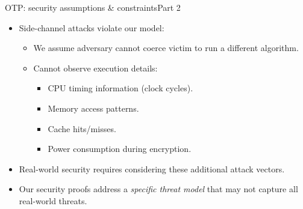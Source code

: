 \documentclass[aspectratio=169, lualatex, handout]{beamer}
\begin{document}
\begin{frame}{OTP: security assumptions \& constraints}{Part 2}
	\begin{itemize}[<+->]
		\item Side-channel attacks violate our model:
		      \begin{itemize}[<+->]
			      \item We assume adversary cannot coerce victim to run a different algorithm.
			      \item Cannot observe execution details:
			            \begin{itemize}[<+->]
				            \item CPU timing information (clock cycles).
				            \item Memory access patterns.
				            \item Cache hits/misses.
				            \item Power consumption during encryption.
			            \end{itemize}
		      \end{itemize}
		\item Real-world security requires considering these additional attack vectors.
		\item Our security proofs address a \textit{specific threat model} that may not capture all real-world threats.
	\end{itemize}
\end{frame}
\end{document}

